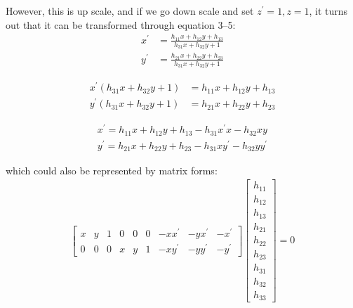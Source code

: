 \documentclass[conference]{IEEEtran}
\begin{document}
\noindent However, this is up scale, and if we go down scale and set $z^\prime = 1, z = 1$, it turns out that it can be transformed through equation 3--5:
\begin{equation}
	\begin{split}
		x^\prime &=\frac{ h_{11}x + h_{12}y + h_{13}}{h_{31}x + h_{32}y + 1}\\
		y^\prime &= \frac{h_{21}x + h_{22}y + h_{23}}{h_{31}x + h_{32}y + 1}
	\end{split}
\end{equation}

\begin{equation}
	\begin{split}
		x^\prime (h_{31}x + h_{32}y + 1) &= h_{11}x + h_{12}y + h_{13}\\
		y^\prime (h_{31}x + h_{32}y + 1)&= h_{21}x + h_{22}y + h_{23}
	\end{split}
\end{equation}

\begin{equation}
	\begin{split}
		x^\prime = h_{11}x + h_{12}y + h_{13} - h_{31}x^\prime x - h_{32}xy\\
		y^\prime = h_{21}x + h_{22}y + h_{23} - h_{31}xy^\prime - h_{32}yy^\prime
	\end{split}
\end{equation}

\noindent which could also be represented by matrix forms:
\begin{equation}
	\begin{split}
		\begin{bmatrix}
			x & y & 1 & 0 & 0 & 0 & -xx^\prime & -yx^\prime & -x^\prime \\
			0 & 0 & 0 & x & y & 1 & -xy^\prime & -yy^\prime & -y^\prime
		\end{bmatrix}
		\begin{bmatrix}
			h_{11} \\
			h_{12} \\
			h_{13} \\
			h_{21} \\
			h_{22} \\
			h_{23} \\
			h_{31} \\
			h_{32} \\
			h_{33}
		\end{bmatrix} = 0
	\end{split}
\end{equation}
\end{document}
